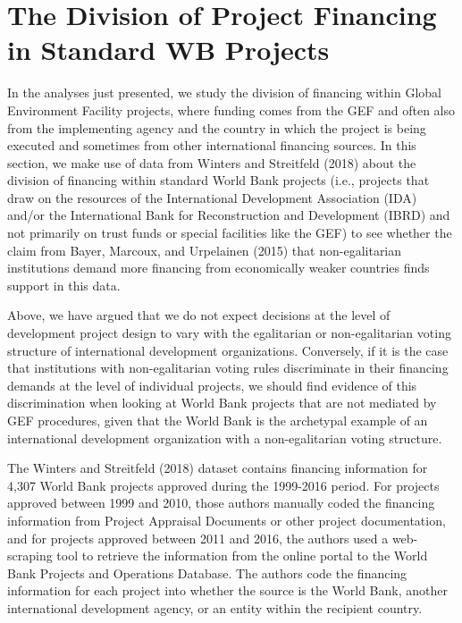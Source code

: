 \documentclass{article}
\begin{document}
\section{The Division of Project Financing in Standard WB Projects}
In the analyses just presented, we study the division of financing within Global Environment Facility projects, where funding comes from the GEF and often also from the implementing agency and the country in which the project is being executed and sometimes from other international financing sources.  In this section, we make use of data from Winters and Streitfeld (2018) about the division of financing within standard World Bank projects (i.e., projects that draw on the resources of the International Development Association (IDA) and/or the International Bank for Reconstruction and Development (IBRD) and not primarily on trust funds or special facilities like the GEF) to see whether the claim from Bayer, Marcoux, and Urpelainen (2015) that non-egalitarian institutions demand more financing from economically weaker countries finds support in this data. 

Above, we have argued that we do not expect decisions at the level of development project design to vary with the egalitarian or non-egalitarian voting structure of international development organizations.  Conversely, if it is the case that institutions with non-egalitarian voting rules discriminate in their financing demands at the level of individual projects, we should find evidence of this discrimination when looking at World Bank projects that are not mediated by GEF procedures, given that the World Bank is the archetypal example of an international development organization with a non-egalitarian voting structure.

The Winters and Streitfeld (2018) dataset contains financing information for 4,307 World Bank projects approved during the 1999-2016 period.  For projects approved between 1999 and 2010, those authors manually coded the financing information from Project Appraisal Documents or other project documentation, and for projects approved between 2011 and 2016, the authors used a web-scraping tool to retrieve the information from the online portal to the World Bank Projects and Operations Database.  The authors code the financing information for each project into whether the source is the World Bank, another international development agency, or an entity within the recipient country.
  
\end{document}
